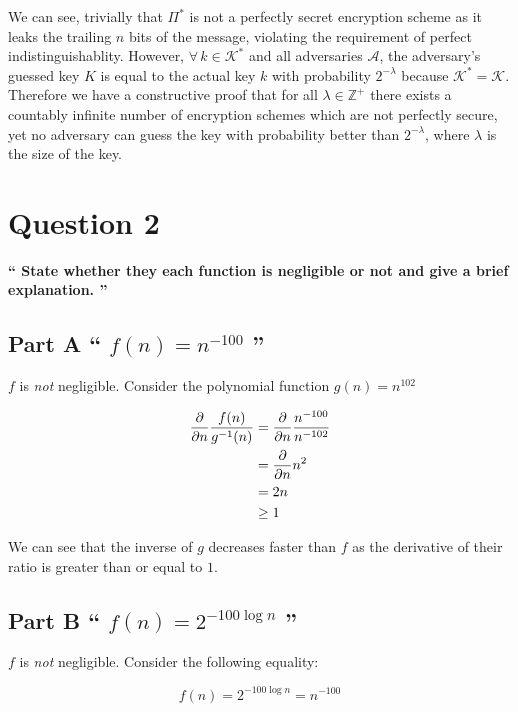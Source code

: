 \documentclass{article}
\newcommand{\HomeworkText}[1]{\textbf{``#1''}\\}
\begin{document}
    We can see, trivially that $\Pi^{*}$ is not a perfectly secret encryption scheme as it leaks the trailing $n$ bits of the message, violating the requirement of perfect indistinguishablity. However, $\forall\, k \in \mathcal{K}^{*}$ and all adversaries $\mathcal{A}$, the adversary's guessed key $K$ is equal to the actual key $k$ with probability $2^{-\lambda}$ because $\mathcal{K}^{*} = \mathcal{K}$.    
    Therefore we have a constructive proof that for all $\lambda \in \mathbb{Z}^{+}$ there exists a countably infinite number of encryption schemes which are not perfectly secure, yet no adversary can guess the key with probability better than $2^{-\lambda}$, where $\lambda$ is the size of the key.


	\clearpage
	\section*{Question 2}
	\HomeworkText{
		State whether they each function is negligible or not and give a brief explanation.
	}

	\subsection*{Part A
	\HomeworkText{
		$f(n) = n^{-100}$
	}}

	$f$ is \emph{not} negligible. Consider the polynomial function $g(n) = n^{102}$
	
	\begin{equation}
	\begin{split}
	\pdv{}{n} \frac{f(n)}{g^{-1}(n)} & = \pdv{}{n} \frac{n^{-100}}{n^{-102}} \\
	  & = \pdv{}{n} n^2 \\
	  & = 2n \\
	  & \ge 1
	\end{split}
	\end{equation}
	
	We can see that the inverse of $g$ decreases faster than $f$ as the derivative of their ratio is greater than or equal to $1$.

	\subsection*{Part B
	\HomeworkText{
		$f(n) = 2^{-100 \log n}$
	}}

	$f$ is \emph{not} negligible. Consider the following equality:
	
	$$ f(n) = 2^{-100 \log n} = n^{-100}$$
	
\end{document}
